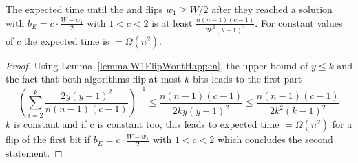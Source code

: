 \begin{corollary}\label{corollary:W1FlipWontHappen}
    The expected time until the \RLSR[k] and \RLSN[k] flips $w_1\ge W/2$ after they reached a solution with $b_E = c\cdot\frac{W-w_1}{2}$ with $1<c<2$ is at least \(\frac{n(n-1)(c-1)}{2k^2{(k-1)}^2}\). For constant values of $c$ the expected time is $=\Omega(n^2)$.
\end{corollary}
\begin{proof}
    Using Lemma~\ref{lemma:W1FlipWontHappen}, the upper bound of $y\le k$ and the fact that both algorithms flip at most $k$ bits leads to the first part
    \[
        {(\sum_{i=2}^{k}\frac{2y{(y-1)}^2}{n(n-1)(c-1)})}^{-1}
        \le\frac{n(n-1)(c-1)}{2ky{(y-1)}^2}
        \le\frac{n(n-1)(c-1)}{2k^2{(k-1)}^2}
    \]
    $k$ is constant and if c is constant too, this leads to expected time $=\Omega(n^2)$ for a flip of the first bit if $b_E = c\cdot\frac{W-w_1}{2}$ with $1<c<2$ which concludes the second statement.
\end{proof}

